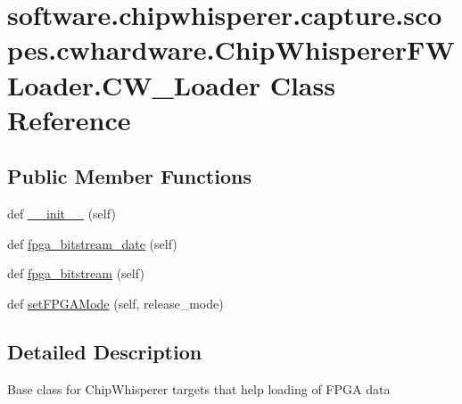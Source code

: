 \hypertarget{classsoftware_1_1chipwhisperer_1_1capture_1_1scopes_1_1cwhardware_1_1ChipWhispererFWLoader_1_1CW__Loader}{}\section{software.\+chipwhisperer.\+capture.\+scopes.\+cwhardware.\+Chip\+Whisperer\+F\+W\+Loader.\+C\+W\+\_\+\+Loader Class Reference}
\label{classsoftware_1_1chipwhisperer_1_1capture_1_1scopes_1_1cwhardware_1_1ChipWhispererFWLoader_1_1CW__Loader}
\subsection*{Public Member Functions}
\begin{DoxyCompactItemize}
\item 
def \hyperlink{classsoftware_1_1chipwhisperer_1_1capture_1_1scopes_1_1cwhardware_1_1ChipWhispererFWLoader_1_1CW__Loader_a947e9dd0ee6dd63a58752165ba320ce2}{\+\_\+\+\_\+init\+\_\+\+\_\+} (self)
\item 
def \hyperlink{classsoftware_1_1chipwhisperer_1_1capture_1_1scopes_1_1cwhardware_1_1ChipWhispererFWLoader_1_1CW__Loader_a1e9fcd4c8b2bb58ffb66ff58ac19dc15}{fpga\+\_\+bitstream\+\_\+date} (self)
\item 
def \hyperlink{classsoftware_1_1chipwhisperer_1_1capture_1_1scopes_1_1cwhardware_1_1ChipWhispererFWLoader_1_1CW__Loader_af1bed59fba90b904d6ab88d676520770}{fpga\+\_\+bitstream} (self)
\item 
def \hyperlink{classsoftware_1_1chipwhisperer_1_1capture_1_1scopes_1_1cwhardware_1_1ChipWhispererFWLoader_1_1CW__Loader_a08b83b4a6789cc02ee7639e11febe017}{set\+F\+P\+G\+A\+Mode} (self, release\+\_\+mode)
\end{DoxyCompactItemize}


\subsection{Detailed Description}
\begin{DoxyVerb}Base class for ChipWhisperer targets that help loading of FPGA data \end{DoxyVerb}
 

